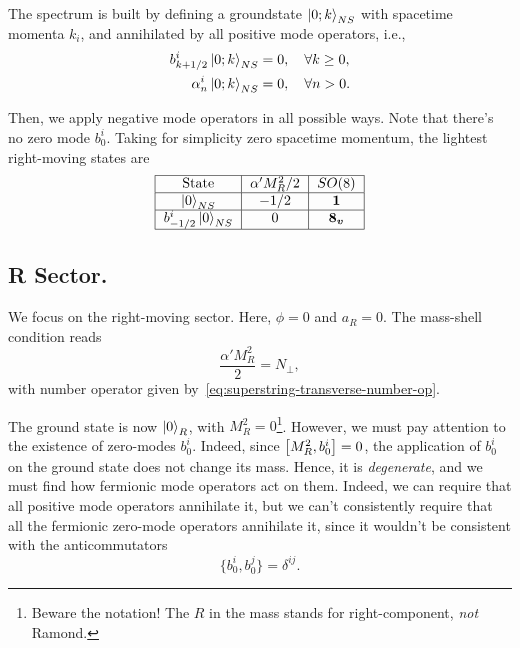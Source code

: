The spectrum is built by defining a groundstate $\ket{0;k}_{NS}$ with spacetime momenta $k_i$, and annihilated by all positive mode operators, i.e.,
\begin{equation}
\begin{aligned}
    b^i_{k +1/2} \ket{0;k}_{NS} &= 0, \quad \forall k \geq 0, \\
    \alpha^i_n \ket{0;k}_{NS} &= 0, \quad \forall n > 0. \\
\end{aligned}
\end{equation}

Then, we apply negative mode operators in all possible ways. Note that there's no zero mode $b^i_0$. Taking for simplicity zero spacetime momentum, the lightest right-moving states are
\begin{equation}\label{eq:table-NS}
\begin{tabular}{|c|c|c|} \hline
    State & $\alpha' M^2_R / 2$ & $SO(8)$ \\ \hline
    $\ket{0}_{NS}$   & $-1/2$   & $\i$   \\ \hline
    $b^i_{-1/2} \ket{0}_{NS}$   & $0$   & $\v$  \\ \hline
\end{tabular}
\end{equation}

\subsection{R Sector.}
We focus on the right-moving sector. Here, $\phi = 0$ and $a_R = 0$. The mass-shell condition reads
\begin{equation}\label{eq:R-mass-shell}
    \frac{\alpha' M^2_R}{2} = N_\perp,
\end{equation}
with number operator given by~\eqref{eq:superstring-transverse-number-op}.

The ground state is now $\ket{0}_R$, with $M_R^2 = 0$\footnote{Beware the notation! The $R$ in the mass stands for right-component, \emph{not} Ramond.}. However, we must pay attention to the existence of zero-modes $b^i_0$. Indeed, since $\comm{M^2_R}{b^i_0} = 0$, the application of $b^i_0$ on the ground state does not change its mass. Hence, it is \emph{degenerate}, and we must find how fermionic mode operators act on them. Indeed, we can require that all positive mode operators annihilate it, but we can't consistently require that all the fermionic zero-mode operators annihilate it, since it wouldn't be consistent with the anticommutators
\begin{equation}\label{eq:superstring-clifford}
    \{ b^i_0, b^j_0 \} = \delta^{ij}.
\end{equation}

